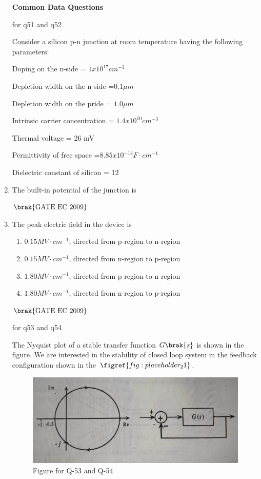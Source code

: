 \documentclass[journal,12pt,onecolumn]{IEEEtran}
\theoremstyle{remark}
\begin{document}
\begin{enumerate}
\textbf{Common Data Questions}

for q51 and q52

Consider a silicon p-n junction at room temperature having the following parameters:

Doping on the n-side = $1 x 10^{17} cm^{-3}$

Depletion width on the n-side =$ 0.1 \mu m $

Depletion width on the pride = $1.0 \mu m $

Intrinsic carrier concentration = $1.4 x 10^{10} cm^{-3} $

Thermal voltage = 26 mV 

Permittivity of free space =$8.85 x 10^{-14 }F \cdot cm^{-1} $

Dielectric constant of silicon = 12
\item The built-in potential of the junction is 
\begin{enumerate}
\end{enumerate}
\hfill $\brak{\text{GATE EC 2009}}$

\item The peak electric field in the device is
\begin{enumerate}
        \item $0.15 MV\cdot cm^{-1}$, directed from p-region to n-region
        \item $0.15 MV\cdot cm^{-1}$, directed from n-region to p-region
        \item $1.80  MV\cdot cm^{-1}$, directed from p-region to n-region
        \item $1.80 MV\cdot cm^{-1}$, directed from n-region to p-region
\end{enumerate}
\hfill $\brak{\text{GATE EC 2009}}$

for q53 and q54

The Nyquist plot of a stable transfer function $G\brak{s}$ is shown in the figure. We are interested in the stability of closed loop system in the feedback configuration shown in the $\figref{fig:placeholder_21}$. 
\begin{figure}[H]
    \centering
    \includegraphics[width=0.5\columnwidth]{figs/fig_22.jpg}
    \caption{\centering Figure for Q-53 and Q-54}
    \label{fig:placeholder_21}
\end{figure}


\end{enumerate}
\end{document}
